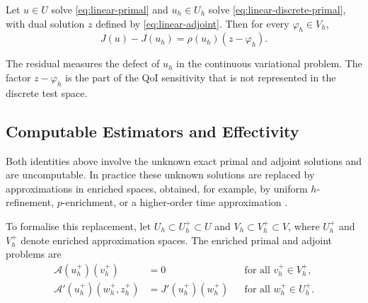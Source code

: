 \begin{proposition}
\label{prop:linear-dwr}
Let \(u\in U\) solve \eqref{eq:linear-primal} and \(u_h\in U_h\) solve \eqref{eq:linear-discrete-primal}, with dual solution \(z\) defined by \eqref{eq:linear-adjoint}. Then for every \(\varphi_h\in V_h\),
\begin{equation}
  J(u)-J(u_h)
  =
  \rho(u_h)(z-\varphi_h).
  \label{eq:linear-dwr-exact}
\end{equation}
\end{proposition}
The residual measures the defect of \(u_h\) in the continuous variational problem. The factor \(z-\varphi_h\) is the part of the QoI sensitivity that is not represented in the discrete test space.


\subsection{Computable Estimators and Effectivity}
\label{sec:background-effectivity}

Both identities above involve the unknown exact primal and adjoint solutions and are uncomputable. In practice these unknown solutions are replaced by approximations in enriched spaces, obtained, for example, by uniform \(h\)-refinement, \(p\)-enrichment, or a higher-order time approximation \cite{Becker_Rannacher_2001,ENDTMAYER202419}.

To formalise this replacement, let \(U_h\subset U_h^+\subset U\) and \(V_h\subset V_h^+\subset V\), where \(U_h^+\) and \(V_h^+\) denote enriched approximation spaces. The enriched primal and adjoint problems are
\begin{align}
  \mathcal{A}(u_h^+)(v_h^+)&=0
  &&\text{for all }v_h^+\in V_h^+,
  \label{eq:enriched-primal}\\
  \mathcal{A}'(u_h^+)(w_h^+,z_h^+)
  &=J'(u_h^+)(w_h^+)
  &&\text{for all }w_h^+\in U_h^+.
  \label{eq:enriched-adjoint}
\end{align}

